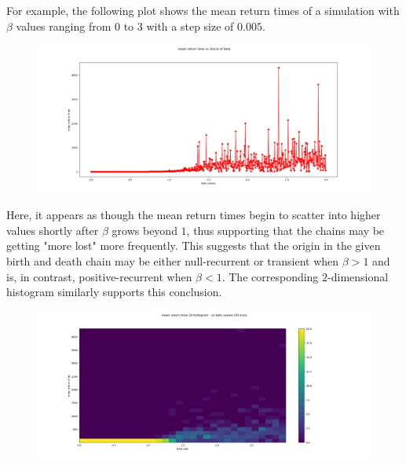 For example, the following plot shows the mean return times of a simulation with $\beta$ values ranging
from $0$ to $3$ with a step size of $0.005$.

\noindent
\begin{figure}[H]
    \centering
    \includegraphics[width=1.25\textwidth]{plots/plot1.png}
\end{figure}

Here, it appears as though the mean return times begin to scatter into higher values shortly after
$\beta$ grows beyond $1$, thus supporting that the chains may be getting "more lost" more frequently.
This suggests that the origin in the given birth and death chain may be either null-recurrent or
transient when $\beta > 1$ and is, in contrast, positive-recurrent when $\beta < 1$. The corresponding
$2$-dimensional histogram similarly supports this conclusion.

\noindent
\begin{figure}[H]
    \centering
    \includegraphics[width=1.25\textwidth]{plots/plot2.png}
\end{figure}

